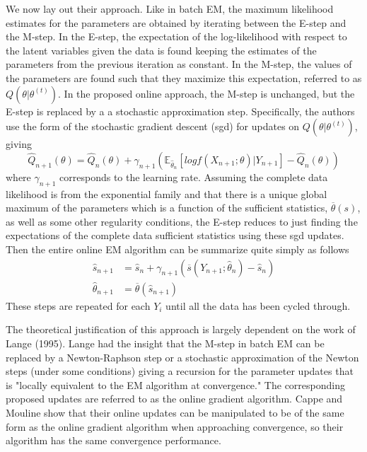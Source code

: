 \documentclass[12pt]{article}
\begin{document}
We now lay out their approach. Like in batch EM, the maximum likelihood estimates for the parameters are obtained by iterating between the E-step and the M-step. In the E-step, the expectation of the log-likelihood with respect to the latent variables given the data is found keeping the estimates of the parameters from the previous iteration as constant. In the M-step, the values of the parameters are found such that they maximize this expectation, referred to as $Q(\theta | \theta^{(t)})$. In the proposed online approach, the M-step is unchanged, but the E-step is replaced by a a stochastic approximation step. Specifically, the authors use the form of the stochastic gradient descent (sgd) for updates on $Q(\theta | \theta^{(t)})$, giving
\begin{equation}
\hat{Q}_{n+1}(\theta) = \hat{Q}_{n}(\theta) + \gamma_{n+1}(\mathbb{E}_{\hat{\theta}_{n}}[log f(X_{n+1};\theta)|Y_{n+1}] - \hat{Q}_{n}(\theta))
\end{equation}
where $\gamma_{n+1}$ corresponds to the learning rate. Assuming the complete data likelihood is from the exponential family and that there is a unique global maximum of the parameters which is a function of the sufficient statistics, $\overline{\theta}(s)$,  as well as some other regularity conditions, the E-step reduces to just finding the expectations of the complete data sufficient statistics using these sgd updates. Then the entire online EM algorithm can be summarize quite simply as follows
\begin{align}
\hat{s}_{n+1} &= \hat{s}_{n} + \gamma_{n+1}(\overline{s}(Y_{n+1}; \hat{\theta}_{n}) - \hat{s}_{n}) \nonumber \\
\hat{\theta}_{n+1} &= \overline{\theta}(\hat{s}_{n+1})
\end{align}
These steps are repeated for each $Y_{i}$ until all the data has been cycled through.

The theoretical justification of this approach is largely dependent on the work of Lange (1995). Lange had the insight that the M-step in batch EM can be replaced by a Newton-Raphson step or a stochastic approximation of the Newton steps (under some conditions) giving a recursion for the parameter updates that is "locally equivalent to the EM algorithm at convergence." The corresponding proposed updates are referred to as the online gradient algorithm. Cappe and Mouline show that their online updates can be manipulated to be of the same form as the online gradient algorithm when approaching convergence, so their algorithm has the same convergence performance. 
\end{document}

